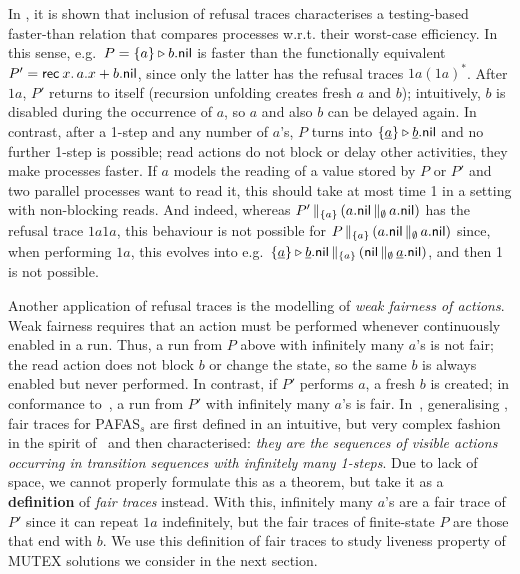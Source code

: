 \documentclass[copyright,creativecommons]{eptcs}
\newcommand{\Nil}{{\sf nil}}
\newcommand{\rec}{{\sf rec} \:}
\newcommand{\rop}{\triangleright}
\begin{document}
In \cite{CVJ02}, it is shown that inclusion of refusal traces characterises
a testing-based faster-than relation that compares processes w.r.t. their
worst-case efficiency. In this sense, e.g.\ $P = \{a\} \rop b.\Nil$ is
faster than the functionally equivalent $P'  =\rec x.\, a.x +b.\Nil$, since
only the latter has the refusal traces $1a(1a)^{\ast}$.  After $1a$, $P'$
returns to itself (recursion unfolding creates fresh $a$ and $b$);
intuitively, $b$ is disabled during the occurrence of $a$, so $a$ and also
$b$ can be delayed again. In contrast, after a 1-step and any number of
$a$'s, $P$ turns into $\{\underline{a}\} \rop \underline{b}.\Nil$ and no
further 1-step is possible; read actions do not block or delay other
activities, they make processes faster. If $a$ models the reading of a
value stored by $P$ or $P'$ and two parallel processes want to read it,
this should take at most time 1 in a setting with non-blocking reads. And
indeed, whereas $P' \,\|_{\{a\}}\, (a.\Nil \,\|_{\emptyset}\, a.\Nil)$ has
the refusal trace $1a1a$, this behaviour is not possible for $P
\,\|_{\{a\}}\, (a.\Nil\,\|_{\emptyset}\, a.\Nil)$ since, when performing
$1a$, this evolves into e.g.\ $\{\underline{a}\} \rop \underline{b}.\Nil
\,\|_{\{a\}}\, (\Nil \,\|_{\emptyset}\, \underline{a}.\Nil)$, and
then 1 is not possible.

Another application of refusal traces is the modelling of {\it weak
fairness of actions}. Weak fairness requires that an action must be
performed whenever continuously enabled in a run. Thus, a run from $P$
above with infinitely many $a$'s is not fair; the read action does not
block $b$ or change the state, so the same $b$ is  always enabled but never
performed. In contrast, if $P'$ performs $a$, a fresh $b$ is created; in
conformance to~\cite{CostaS84}, a run from $P'$ with infinitely many $a$'s
is fair. In~\cite{CDV08tr}, generalising \cite{CDV06}, fair traces for
PAFAS$_s$ are first defined in an intuitive, but very complex fashion in
the spirit of~\cite{CostaS84,CostaS87} and then characterised: {\em they
are the sequences of visible actions occurring in transition sequences with
infinitely many 1-steps}. 
Due to lack of space, we cannot properly formulate this as a theorem, but
take it as a {\bf definition} of \emph{fair traces} instead. With this,
infinitely many $a$'s are a fair trace of $P'$ since it can repeat $1a$
indefinitely, but the fair traces of finite-state $P$ are those that end
with $b$. We use this definition of fair traces to study liveness property
of MUTEX solutions we consider in the next section. 
\end{document}
